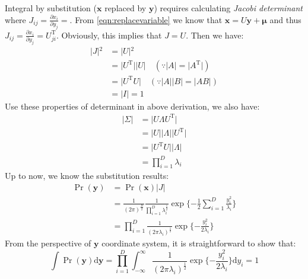 Integral by substitution ($\mathbf{x}$ replaced by $\mathbf{y}$)
    requires calculating \emph{Jacobi determinant} where
    $J_{ij}=\frac{\partial{}x_{i}}{\partial{}y_{j}}=$. From
    \eqref{eqn:replacevariable} we know that
    $\mathbf{x}=U\mathbf{y}+\boldsymbol{\mu}$ and thus
    $J_{ij}=\frac{\partial{}x_{i}}{\partial{}y_{j}}=U_{ji}^{\mathrm{T}}$.
    Obviously, this implies that $J=U$. Then we have:
\begin{equation}
\begin{split}
\vert{}J\vert{}^{2}&=\vert{}U\vert{}^{2}\\
&=\vert{}U^{\mathrm{T}}\vert{}\vert{}U\vert{}\quad{}(\because{}\vert{}A\vert{}=\vert{}A^{\mathrm{T}}\vert{})\\
&=\vert{}U^{\mathrm{T}}U\vert{}\quad{}(\because{}\vert{}A\vert{}\vert{}B\vert{}=\vert{}AB\vert{})\\
&=\vert{}I\vert{}=1
\end{split}
\end{equation}
Use these properties of determinant in above derivation, we also have:
\begin{equation}
\begin{split}
\vert{}\Sigma\vert{}&=\vert{}U\Lambda{}U^{\mathrm{T}}\vert{}\\
&=\vert{}U\vert{}\vert{}\Lambda\vert{}\vert{}U^{\mathrm{T}}\vert{}\\
&=\vert{}U^{\mathrm{T}}U\vert{}\vert{}\Lambda\vert{}\\
&=\prod_{i=1}^{D}\lambda_{i}
\end{split}
\label{eqn:detofsymmetric}
\end{equation}
Up to now, we know the substitution results:
\begin{equation}
\begin{split}
\Pr(\mathbf{y})&=\Pr(\mathbf{x})\vert{}J\vert{}\\
&=\frac{1}{(2\pi)^{\frac{D}{2}}}\frac{1}{\prod_{i=1}^{D}\lambda_{i}^{\frac{1}{2}}}\exp{}\{-\frac{1}{2}\sum_{i=1}^{D}\frac{y_{i}^2}{\lambda_i}\}\\
&=\prod_{i=1}^{D}\frac{1}{(2\pi\lambda_i)^{\frac{1}{2}}}\exp{}\{-\frac{y_{i}^2}{2\lambda_i}\}
\end{split}
\label{eqn:subgaussian}
\end{equation}
From the perspective of $\mathbf{y}$ coordinate system, it is
straightforward to show that:
\begin{equation}
\int{}\Pr(\mathbf{y})\text{d}\mathbf{y}=\prod_{i=1}^{D}\int_{-\infty}^{\infty}\frac{1}{(2\pi\lambda_{i})^{\frac{1}{2}}}\exp{}\{-\frac{y_{i}^2}{2\lambda_{i}}\}\text{d}y_{i}=1
\end{equation}



